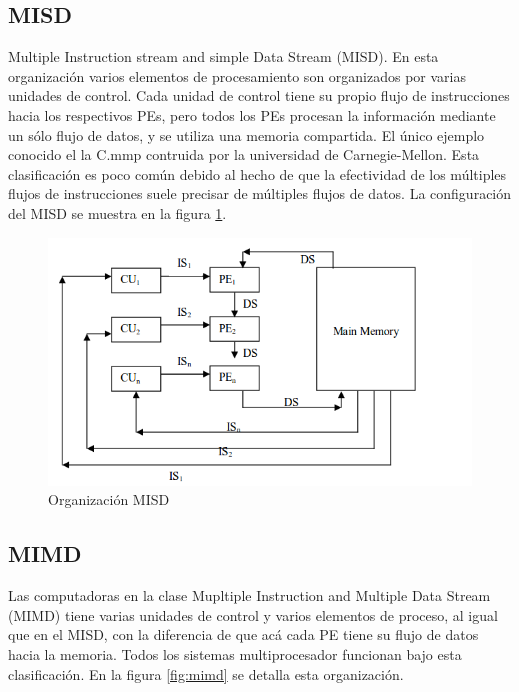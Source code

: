 \documentclass[a4paper,12pt]{article}
\begin{document}
\subsection{MISD}

Multiple Instruction stream and simple Data Stream (MISD). En esta organización varios elementos de procesamiento son
organizados por varias unidades de control. Cada unidad de control tiene su propio flujo de instrucciones hacia los 
respectivos PEs, pero todos los PEs procesan la información mediante un sólo flujo de datos, y se utiliza una memoria
compartida. El único ejemplo conocido el la C.mmp contruida por la universidad de Carnegie-Mellon. 
Esta clasificación es poco común debido al hecho de que la efectividad de los múltiples flujos de instrucciones
suele precisar de múltiples flujos de datos.
La configuración del MISD se muestra en la figura \ref{fig:misd}.

\begin{figure}
 \centering
 \includegraphics[scale=0.5]{5.png}
 \caption{Organización MISD}
 \label{fig:misd}
\end{figure}

\subsection{MIMD}

Las computadoras en la clase Mupltiple Instruction and Multiple Data Stream (MIMD) tiene varias unidades de control y
varios elementos de proceso, al igual que en el MISD, con la diferencia de que acá cada PE tiene su flujo de datos hacia
la memoria. Todos los sistemas multiprocesador funcionan bajo esta clasificación. En la figura \ref{fig:mimd} se detalla
esta organización.
\end{document}

